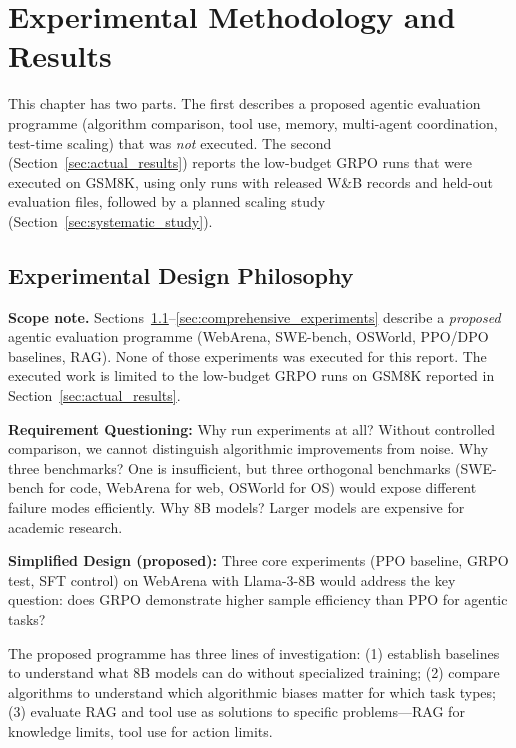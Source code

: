 \documentclass[12pt,a4paper]{report}
\theoremstyle{definition}
\begin{document}
\chapter{Experimental Methodology and Results}
\label{ch:experiments}

This chapter has two parts. The first describes a proposed agentic evaluation programme (algorithm comparison, tool use, memory, multi-agent coordination, test-time scaling) that was \emph{not} executed. The second (Section~\ref{sec:actual_results}) reports the low-budget GRPO runs that were executed on GSM8K, using only runs with released W\&B records and held-out evaluation files, followed by a planned scaling study (Section~\ref{sec:systematic_study}).

\vspace{0.3cm}

\section{Experimental Design Philosophy}
\label{sec:design_philosophy}

\textbf{Scope note.} Sections~\ref{sec:design_philosophy}--\ref{sec:comprehensive_experiments} describe a \emph{proposed} agentic evaluation programme (WebArena, SWE-bench, OSWorld, PPO/DPO baselines, RAG). None of those experiments was executed for this report. The executed work is limited to the low-budget GRPO runs on GSM8K reported in Section~\ref{sec:actual_results}.

\textbf{Requirement Questioning:} Why run experiments at all? Without controlled comparison, we cannot distinguish algorithmic improvements from noise. Why three benchmarks? One is insufficient, but three orthogonal benchmarks (SWE-bench for code, WebArena for web, OSWorld for OS) would expose different failure modes efficiently. Why 8B models? Larger models are expensive for academic research.

\textbf{Simplified Design (proposed):} Three core experiments (PPO baseline, GRPO test, SFT control) on WebArena with Llama-3-8B would address the key question: does GRPO demonstrate higher sample efficiency than PPO for agentic tasks?

The proposed programme has three lines of investigation: (1) establish baselines to understand what 8B models can do without specialized training; (2) compare algorithms to understand which algorithmic biases matter for which task types; (3) evaluate RAG and tool use as solutions to specific problems---RAG for knowledge limits, tool use for action limits.
\end{document}

